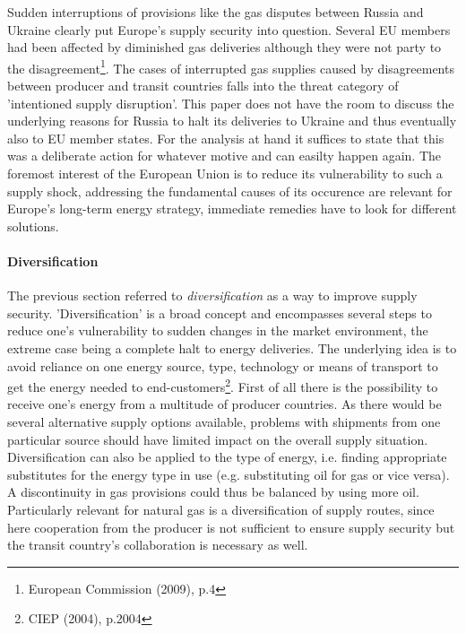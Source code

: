 \documentclass[11pt,a4paper,english]{scrreprt}
\begin{document}
Sudden interruptions of provisions like the gas disputes between Russia and
Ukraine clearly put Europe's supply security into question. Several EU members
had been affected by diminished gas deliveries although they were not party to
the disagreement\footnote{European Commission (2009), p.4}. The cases of
interrupted gas supplies caused by disagreements between producer and transit
countries falls into the threat category of 'intentioned supply disruption'.
This paper does not have the room to discuss the underlying reasons for Russia
to halt its deliveries to Ukraine and thus eventually also to EU member states.
For the analysis at hand it suffices to state that this was a deliberate action
for whatever motive and can easilty happen again. The foremost interest of the
European Union is to reduce its vulnerability to such a supply shock, addressing
the fundamental causes of its occurence are relevant for Europe's long-term
energy strategy, immediate remedies have to look for different solutions.\par

	  \paragraph{Diversification}

The previous section referred to \emph{diversification} as a way to improve
supply security. 'Diversification' is a broad concept and encompasses several
steps to reduce one's vulnerability to sudden changes in the market
environment, the extreme case being a complete halt to energy deliveries. The
underlying idea is to avoid reliance on one energy source, type, technology or
means of transport to get the energy needed to end-customers\footnote{CIEP
(2004), p.2004}. First of all there is the possibility to receive one's energy
from a multitude of producer countries. As there would be several alternative
supply options available, problems with shipments from one particular source
should have limited impact on the overall supply situation. Diversification can
also be applied to the type of energy, i.e. finding appropriate substitutes for
the energy type in use (e.g. substituting oil for gas or vice versa). A
discontinuity in gas provisions could thus be balanced by using more oil.
Particularly relevant for natural gas is a diversification of supply routes,
since here cooperation from the producer is not sufficient to ensure supply
security but the transit country's collaboration is necessary as well.\par
\end{document}
